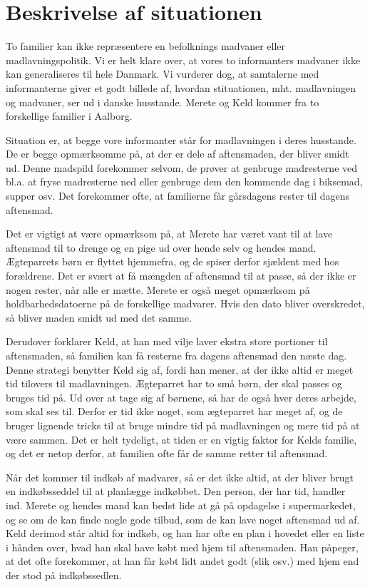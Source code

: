\section{Beskrivelse af situationen}
\label{sec:situation}

To familier kan ikke repræsentere en befolknings madvaner eller madlavningspolitik. Vi er helt klare over, at vores to informanters madvaner ikke kan generaliseres til hele Danmark. Vi vurderer dog, at samtalerne med informanterne giver et godt billede af, hvordan stituationen, mht. madlavningen og madvaner, ser ud i danske husstande. Merete og Keld kommer fra to forskellige familier i Aalborg.

Situation er, at begge vore informanter står for madlavningen i deres husstande. De er begge opmærksomme på, at der er dele af aftensmaden, der bliver smidt ud. Denne madspild forekommer selvom, de prøver at genbruge madresterne ved bl.a. at fryse madresterne ned eller genbruge dem den kommende dag i \fx biksemad, supper osv. Det forekommer ofte, at familierne får gårsdagens rester til dagens aftensmad.

Det er vigtigt at være opmærksom på, at Merete har været vant til at lave aftensmad til to drenge og en pige ud over hende selv og hendes mand. Ægteparrets børn er flyttet hjemmefra, og de spiser derfor sjældent med hos forældrene. Det er svært at få mængden af aftensmad til at passe, så der ikke er nogen rester, når alle er mætte. Merete er også meget opmærksom på holdbarhedsdatoerne på de forskellige madvarer. Hvis den dato bliver overskredet, så bliver maden smidt ud med det samme.

Derudover forklarer Keld, at han med vilje laver ekstra store portioner til aftensmaden, så familien kan få resterne fra dagens aftensmad den næste dag. Denne strategi benytter Keld sig af, fordi han mener, at der ikke altid er meget tid tilovers til madlavningen. Ægteparret har to små børn, der skal passes og bruges tid på. Ud over at tage sig af børnene, så har de også hver deres arbejde, som skal ses til. Derfor er tid ikke noget, som ægteparret har meget af, og de bruger lignende tricks til at bruge mindre tid på madlavningen og mere tid på at være sammen. Det er helt tydeligt, at tiden er en vigtig faktor for Kelds familie, og det er netop derfor, at familien ofte får de samme retter til aftensmad.

Når det kommer til indkøb af madvarer, så er det ikke altid, at der bliver brugt en indkøbsseddel til at planlægge indkøbbet. Den person, der har tid, handler ind. Merete og hendes mand kan bedst lide at gå på opdagelse i supermarkedet, og se om de kan finde nogle gode tilbud, som de kan lave noget aftensmad ud af. Keld derimod står altid for indkøb, og han har ofte en plan i hovedet eller en liste i hånden over, hvad han skal have købt med hjem til aftensmaden. Han påpeger, at det ofte forekommer, at han får købt lidt andet godt (slik osv.) med hjem end der stod på indkøbssedlen.

